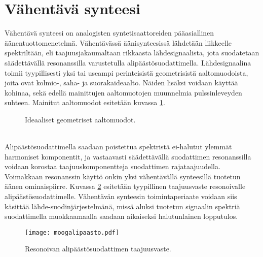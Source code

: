 \documentclass[finnish,12pt,a4paper,pdftex]{article} %
\begin{document}
\clearpage


\section{Vähentävä synteesi}
\label{sec:synteesi}

Vähentävä synteesi on analogisten syntetisaattoreiden pääasiallinen äänentuottomenetelmä. Vähentävässä äänisynteesissä lähdetään liikkeelle spektriltään, eli taajuusjakaumaltaan rikkaasta lähdesignaalista, jota suodatetaan säädettävällä resonanssilla varustetulla alipäästösuodattimella. Lähdesignaalina toimii tyypillisesti yksi tai useampi perinteisistä geometrisistä aaltomuodoista, joita ovat kolmio-, saha- ja suorakaideaalto. Näiden lisäksi voidaan käyttää kohinaa, sekä edellä mainittujen aaltomuotojen muunnelmia pulssinleveyden suhteen. Mainitut aaltomuodot esitetään kuvassa \ref{fig:aaltomuodot}. \cite{Pekonen2014}
\vspace{2mm}
\begin{figure}[h] 
\begin{center} 
\caption{Ideaaliset geometriset aaltomuodot.}
\label{fig:aaltomuodot}
\end{center}
\end{figure} \\
Alipäästösuodattimella saadaan poistettua spektristä ei-halutut ylemmät harmoniset komponentit, ja vastaavasti säädettävällä suodattimen resonanssilla voidaan korostaa taajuuskomponentteja suodattimen rajataajuudella. Voimakkaan resonanssin käyttö onkin yksi vähentävällä synteesillä tuotetun äänen ominaispiirre. Kuvassa \ref{fig:alipäästö} esitetään tyypillinen taajuusvaste resonoivalle alipäästösuodattimelle. Vähentävän synteesin toimintaperiaate voidaan siis käsittää lähde-suodinjärjestelmänä, missä aluksi tuotetun signaalin spektriä suodattimella muokkaamaalla saadaan aikaiseksi halutunlainen lopputulos. \cite{Nostalgia}
\begin{figure}[h] 
\begin{center}
\texttt{[image: moogalipaasto.pdf]}
\caption{Resonoivan alipäästösuodattimen taajuusvaste.}
\label{fig:alipäästö}
\end{center}
\end{figure} \\\\
\end{document}
